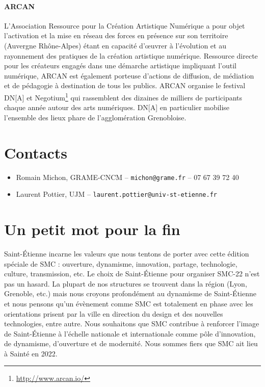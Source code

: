 \documentclass[fontsize=12pt]{scrartcl} %
\numberwithin{equation}{section} %
\numberwithin{table}{section} %
\begin{document}
\paragraph{\textbf{ARCAN}} L'Association Ressource pour la Création Artistique Numérique a pour objet l'activation et la mise en réseau des forces en présence sur son territoire (Auvergne Rhône-Alpes) étant en capacité d'œuvrer à l'évolution et au rayonnement des pratiques de la création artistique numérique. Ressource directe pour les créateurs engagés dans une démarche artistique impliquant l'outil numérique, ARCAN est également porteuse d'actions de diffusion, de médiation et de pédagogie à destination de tous les publics. ARCAN organise le festival DN[A] et Negotium\footnote{\url{http://www.arcan.io/}} qui rassemblent des dizaines de milliers de participants chaque année autour des arts numériques. DN[A] en particulier mobilise l'ensemble des lieux phare de l'agglomération Grenobloise.

\section{Contacts}

\begin{itemize}
\item Romain Michon, GRAME-CNCM -- \texttt{michon@grame.fr} -- 07 67 39 72 40
\item Laurent Pottier, UJM -- \texttt{laurent.pottier@univ-st-etienne.fr} %
\end{itemize}

\section{Un petit mot pour la fin}

Saint-Étienne incarne les valeurs que nous tentons de porter avec cette édition spéciale de SMC : ouverture, dynamisme, innovation, partage, technologie, culture, transmission, etc. Le choix de Saint-Étienne pour organiser SMC-22 n'est pas un hasard. La plupart de nos structures se trouvent dans la région (Lyon, Grenoble, etc.) mais nous croyons profondément au dynamisme de Saint-Étienne et nous pensons qu'un évènement comme SMC est totalement en phase avec les orientations prisent par la ville en direction du design et des nouvelles technologies, entre autre. Nous souhaitons que SMC contribue à renforcer l'image de Saint-Étienne à l'échelle nationale et internationale comme pôle d'innovation, de dynamisme, d'ouverture et de modernité. Nous sommes fiers que SMC ait lieu à Sainté en 2022. 
\end{document}
